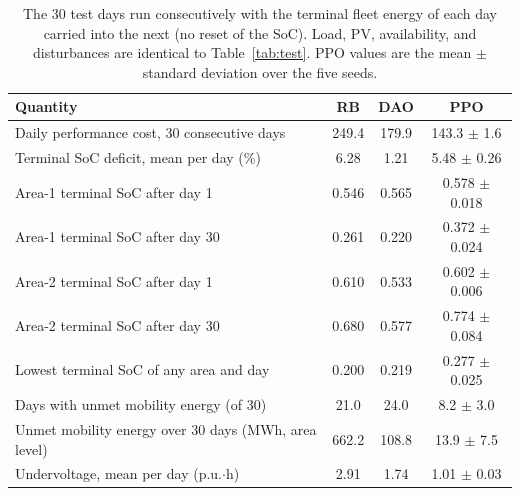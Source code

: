 \begin{table}[!t]
\caption{The 30 test days run consecutively with the terminal fleet energy of each day carried into the next (no reset of the SoC). Load, PV, availability, and disturbances are identical to Table~\ref{tab:test}. PPO values are the mean $\pm$ standard deviation over the five seeds.}
\label{tab:chained}
\centering
\footnotesize
\begin{tabular}{p{3.6cm}ccc}
\toprule
\textbf{Quantity} & \textbf{RB} & \textbf{DAO} & \textbf{PPO}\\
\midrule
Daily performance cost, 30 consecutive days & 249.4 & 179.9 & 143.3 $\pm$ 1.6 \\
Terminal SoC deficit, mean per day (\%) & 6.28 & 1.21 & 5.48 $\pm$ 0.26 \\
Area-1 terminal SoC after day 1 & 0.546 & 0.565 & 0.578 $\pm$ 0.018 \\
Area-1 terminal SoC after day 30 & 0.261 & 0.220 & 0.372 $\pm$ 0.024 \\
Area-2 terminal SoC after day 1 & 0.610 & 0.533 & 0.602 $\pm$ 0.006 \\
Area-2 terminal SoC after day 30 & 0.680 & 0.577 & 0.774 $\pm$ 0.084 \\
Lowest terminal SoC of any area and day & 0.200 & 0.219 & 0.277 $\pm$ 0.025 \\
Days with unmet mobility energy (of 30) & 21.0 & 24.0 & 8.2 $\pm$ 3.0 \\
Unmet mobility energy over 30 days (MWh, area level) & 662.2 & 108.8 & 13.9 $\pm$ 7.5 \\
Undervoltage, mean per day (p.u.$\cdot$h) & 2.91 & 1.74 & 1.01 $\pm$ 0.03 \\
\bottomrule
\end{tabular}
\end{table}
